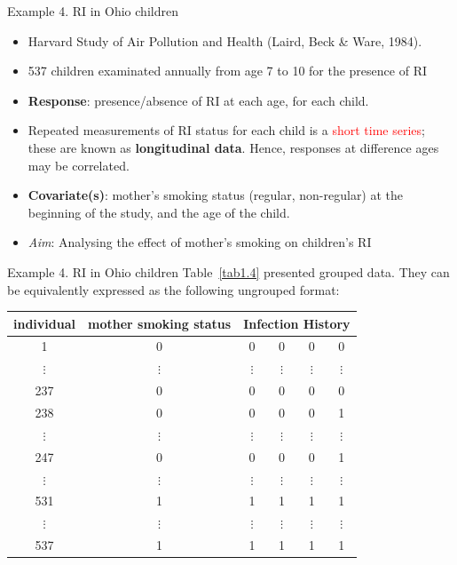 \documentclass{beamer}
\newenvironment{wideitemize}%
  {\begin{itemize}%
    \setlength{\parskip}{1em}}%
  {\end{itemize}}
\begin{document}
\begin{frame}{Example 4. RI in Ohio children }

\begin{wideitemize}
\item
Harvard Study of Air Pollution and Health (Laird, Beck \& Ware, 1984).
\item
537 children examinated  annually from age 7 to 10 for the presence  of RI
\item
\textbf{Response}: presence/absence of RI at each  age, for each child.
\item
Repeated measurements of RI status  for each child is  a 
\textcolor{red}{short time series}; these are known as \textbf{longitudinal data}. Hence, responses at difference ages may be correlated.



\item 
\textbf{Covariate(s)}: mother's smoking status (regular, non-regular) at the beginning of the study, and  the age of the child.
\item
\textit{Aim}: Analysing the effect of mother's smoking on children's RI

\end{wideitemize}

\end{frame}


\begin{frame}{Example 4. RI in Ohio children}
Table~\ref{tab1.4} presented grouped data. They can be equivalently expressed as the following ungrouped format:

\begin{center}
\begin{footnotesize}
\begin{tabular}{|cccccc|}
\hline
individual & mother smoking status & \multicolumn{4}{c|}{Infection History} \\ \hline
1 & 0 & 0 & 0 & 0& 0 \\
$\vdots$ & $\vdots$ & $\vdots$ & $\vdots$ & $\vdots$ & $\vdots$ \\ 
237 & 0 & 0 & 0 & 0& 0 \\
238 & 0 & 0 & 0 & 0& 1 \\
$\vdots$ & $\vdots$ & $\vdots$ & $\vdots$ & $\vdots$ & $\vdots$ \\ 
247 & 0 & 0 & 0 & 0& 1 \\
$\vdots$ & $\vdots$ & $\vdots$ & $\vdots$ & $\vdots$ & $\vdots$ \\ 
531 & 1 & 1 & 1 & 1 & 1 \\
$\vdots$ & $\vdots$ & $\vdots$ & $\vdots$ & $\vdots$ & $\vdots$ \\ 
537 & 1 & 1 & 1 & 1 & 1 \\
\hline
\end{tabular}
\end{footnotesize}
\end{center}


\end{frame}
\end{document}
